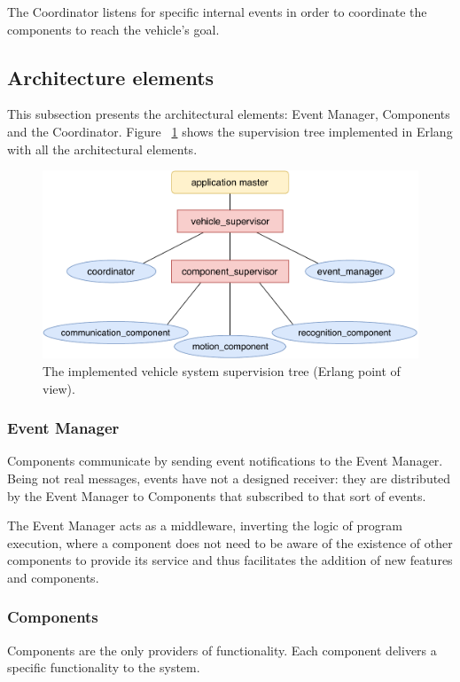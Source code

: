 \documentclass{memoir}
\begin{document}
The Coordinator listens for specific internal events in order to coordinate the components to reach the vehicle's goal.

\subsection{Architecture elements}

This subsection presents the architectural elements: Event Manager, Components and the Coordinator. Figure ~\ref{fig:erlang-point-of-view} shows the supervision tree implemented in Erlang with all the architectural elements.

\begin{figure}
	\centering
	\includegraphics[width=0.8\linewidth]{implementation_details/erlang_point-of-view.pdf}
	\caption{The implemented vehicle system supervision tree (Erlang point of view).}
	\label{fig:erlang-point-of-view}
\end{figure}

\subsubsection{Event Manager}

Components communicate by sending event notifications to the Event Manager.
Being not real messages, events have not a designed receiver: they are distributed by the Event Manager to Components that subscribed to that sort of events.

The Event Manager acts as a middleware, inverting the logic of program execution, where a component does not need to be aware of the existence of other components to provide its service and thus facilitates the addition of new features and components.

\subsubsection{Components}

Components are the only providers of functionality. Each component delivers a specific functionality to the system.
\end{document}

